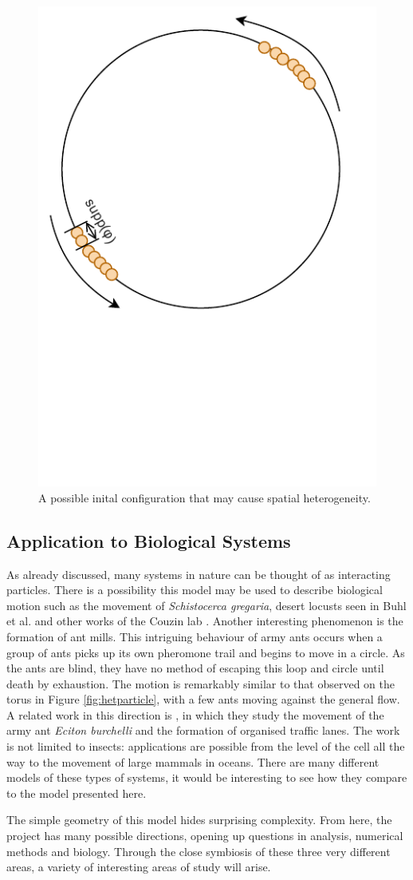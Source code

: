\begin{figure}
    \centering
    \includegraphics[width=0.5\linewidth, trim={0 3cm 0 0}, clip]{Figures/compactphi}
    \caption[A Potential Initial Configuration]{A possible inital configuration that may cause spatial heterogeneity.}
    \label{fig:compactphi}
\end{figure}

\subsection{Application to Biological Systems}
As already discussed, many systems in nature can be thought of as interacting particles. There is a possibility this model may be used to describe biological motion such as the movement of \emph{Schistocerca gregaria}, desert locusts seen in Buhl et al.\cite{Buhl06} and other works of the Couzin lab \cite{Bazazi08,Escudero10}. Another interesting phenomenon is the formation of ant mills. This intriguing behaviour of army ants occurs when a group of ants picks up its own pheromone trail and begins to move in a circle. As the ants are blind, they have no method of escaping this loop and circle until death by exhaustion. The motion is remarkably similar to that observed on the torus in Figure \ref{fig:hetparticle}, with a few ants moving against the general flow. A related work in this direction is \cite{Couzin03}, in which they study the movement of the army ant \emph{Eciton burchelli} and the formation of organised traffic lanes. The work is not limited to insects: applications are possible from the level of the cell all the way to the movement of large mammals in oceans. There are many different models of these types of systems, it would be interesting to see how they compare to the model presented here.


The simple geometry of this model hides surprising complexity. From here, the project has many possible directions, opening up questions in analysis, numerical methods and biology. Through the close symbiosis of these three very different areas, a variety of interesting areas of study will arise.
